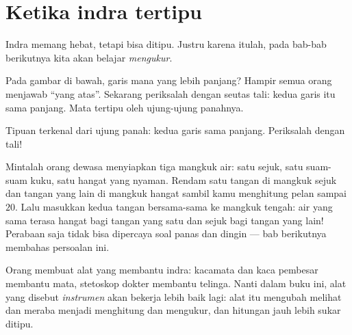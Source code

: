 \section{Ketika indra tertipu}

Indra memang hebat, tetapi bisa ditipu. Justru karena itulah, pada
bab-bab berikutnya kita akan belajar \emph{mengukur}.

\begin{example}\label{ex:g1:five-senses:lines}
Pada gambar di bawah, garis mana yang lebih panjang? Hampir semua
orang menjawab ``yang atas''. Sekarang periksalah dengan seutas tali:
kedua garis itu sama panjang. Mata tertipu oleh ujung-ujung
panahnya.
\end{example}

\begin{omfigure}

{\small Tipuan terkenal dari ujung panah: kedua garis sama panjang.
Periksalah dengan tali!}
\end{omfigure}

\begin{example}\label{ex:g1:five-senses:bowls}
Mintalah orang dewasa menyiapkan tiga mangkuk air: satu sejuk, satu
suam-suam kuku, satu hangat yang nyaman. Rendam satu tangan di
mangkuk sejuk dan tangan yang lain di mangkuk hangat sambil kamu
menghitung pelan sampai $20$. Lalu masukkan kedua tangan bersama-sama
ke mangkuk tengah: air yang sama terasa hangat bagi tangan yang satu
dan sejuk bagi tangan yang lain! Perabaan saja tidak bisa dipercaya
soal panas dan dingin --- bab berikutnya membahas persoalan ini.
\end{example}

\begin{remark}\label{rem:g1:five-senses:tools}
Orang membuat alat yang membantu indra: kacamata dan kaca pembesar
membantu mata, stetoskop dokter membantu telinga. Nanti dalam buku
ini, alat yang disebut \emph{instrumen} akan bekerja lebih baik lagi:
alat itu mengubah melihat dan meraba menjadi menghitung dan mengukur,
dan hitungan jauh lebih sukar ditipu.
\end{remark}

